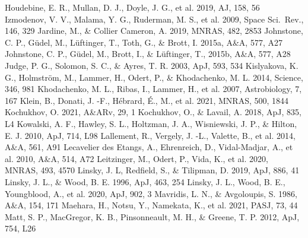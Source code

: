 \documentclass[preprint]{aastex}
\begin{document}
\begin{thebibliography}{}
Houdebine, E. R., Mullan, D. J., Doyle, J. G., et al. 2019, AJ, 158, 56
Izmodenov, V. V., Malama, Y. G., Ruderman, M. S., et al. 2009,
  Space Sci.~Rev., 146, 329
Jardine, M., \& Collier Cameron, A. 2019, MNRAS, 482, 2853
Johnstone, C. P., G\"{u}del, M., L\"{u}ftinger, T., Toth, G., \&
  Brott, I. 2015a, A\&A, 577, A27
Johnstone, C. P., G\"{u}del, M., Brott, I., \& L\"{u}ftinger, T.,
  2015b, A\&A, 577, A28
Judge, P. G., Solomon, S. C., \& Ayres, T. R. 2003, ApJ, 593, 534
Kislyakova, K. G., Holmstr\"{o}m, M., Lammer, H., Odert, P., \&
  Khodachenko, M. L. 2014, Science, 346, 981
Khodachenko, M. L., Ribas, I., Lammer, H., et al. 2007, Astrobiology, 7, 167
Klein, B., Donati, J. -F., H\'{e}brard, \'{E}., M., et al. 2021,
  MNRAS, 500, 1844
Kochukhov, O. 2021, A\&ARv, 29, 1
Kochukhov, O., \& Lavail, A. 2018, ApJ, 835, L4
Kowalski, A. F., Hawley, S. L., Holtzman, J. A., Wisniewski, J. P.,
  \& Hilton, E. J. 2010, ApJ, 714, L98
Lallement, R., Vergely, J. -L., Valette, B., et al. 2014, A\&A, 561, A91
Lecavelier des Etangs, A., Ehrenreich, D., Vidal-Madjar, A., et al.
  2010, A\&A, 514, A72
Leitzinger, M., Odert, P., Vida, K., et al. 2020, MNRAS, 493, 4570
Linsky, J. L, Redfield, S., \& Tilipman, D. 2019, ApJ, 886, 41
Linsky, J. L., \& Wood, B. E. 1996, ApJ, 463, 254
Linsky, J. L., Wood, B. E., Youngblood, A., et al. 2020, ApJ, 902, 3
Mavridis, L. N., \& Avgoloupis, S. 1986, A\&A, 154, 171
Maehara, H., Notsu, Y., Namekata, K., et al. 2021, PASJ, 73, 44
Matt, S. P., MacGregor, K. B., Pinsonneault, M. H., \& Greene, T. P.
  2012, ApJ, 754, L26

\end{thebibliography}
\end{document}
